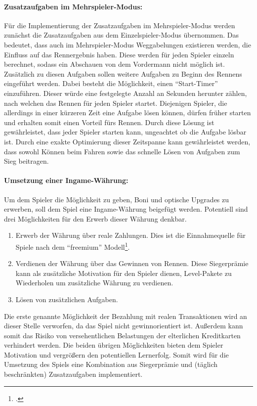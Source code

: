 		\paragraph{Zusatzaufgaben im Mehrspieler-Modus:}
		Für die Implementierung der Zusatzaufgaben im Mehrspieler-Modus werden zunächst die Zusatzaufgaben aus dem Einzelspieler-Modus übernommen. Das bedeutet, dass auch im Mehrspieler-Modus Weggabelungen existieren werden, die Einfluss auf das Rennergebnis haben. Diese werden für jeden Spieler einzeln berechnet, sodass ein Abschauen von dem Vordermann nicht möglich ist. Zusätzlich zu diesen Aufgaben sollen weitere Aufgaben zu Beginn des Rennens eingeführt werden. Dabei besteht die Möglichkeit, einen \enquote{Start-Timer} einzuführen. Dieser würde eine festgelegte Anzahl an Sekunden herunter zählen, nach welchen das Rennen für jeden Spieler startet. Diejenigen Spieler, die allerdings in einer kürzeren Zeit eine Aufgabe lösen können, dürfen früher starten und erhalten somit einen Vorteil fürs Rennen.
		Durch diese Lösung ist gewährleistet, dass jeder Spieler starten kann, ungeachtet ob die Aufgabe lösbar ist. Durch eine exakte Optimierung dieser Zeitspanne kann gewährleistet werden, dass sowohl Können beim Fahren sowie das schnelle Lösen von Aufgaben zum Sieg beitragen.

		\paragraph{Umsetzung einer Ingame-Währung:}
		Um dem Spieler die Möglichkeit zu geben, Boni und optische Upgrades zu erwerben, soll dem Spiel eine Ingame-Währung beigefügt werden. Potentiell sind drei Möglichkeiten für den Erwerb dieser Währung denkbar.
		\begin{enumerate}
			\item{ Erwerb der Währung über reale Zahlungen. Dies ist die Einnahmequelle für Spiele nach dem \enquote{freemium} Modell\footcite[Seite 8]{freemium}. }
			\item{ Verdienen der Währung über das Gewinnen von Rennen. Diese Siegerprämie kann als zusätzliche Motivation für den Spieler dienen, Level-Pakete zu Wiederholen um zusätzliche Währung zu verdienen. }
			\item{ Lösen von zusätzlichen Aufgaben. }
		\end{enumerate}
		Die erste genannte Möglichkeit der Bezahlung mit realen Transaktionen wird an dieser Stelle verworfen, da das Spiel nicht gewinnorientiert ist. Außerdem kann somit das Risiko von versehentlichen Belastungen der elterlichen Kreditkarten verhindert werden.
		Die beiden übrigen Möglichkeiten bieten dem Spieler Motivation und vergrößern den potentiellen Lernerfolg. Somit wird für die Umsetzung des Spiels eine Kombination aus Siegerprämie und (täglich beschränkten) Zusatzaufgaben implementiert.

